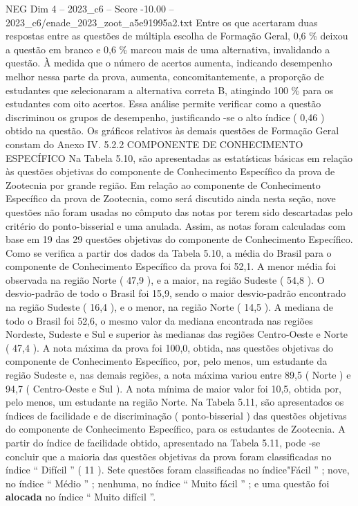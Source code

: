 \begin{textsample}{NEG Dim 4 – 2023\_c6 – Score -10.00 – 2023\_c6/enade\_2023\_zoot\_a5e91995a2.txt}
Entre os que acertaram duas respostas entre as questões de múltipla escolha de Formação Geral, 0,6 \% deixou a questão em branco e 0,6 \% marcou mais de uma alternativa, invalidando a questão.
À medida que o número de acertos aumenta, indicando desempenho melhor nessa parte da prova, aumenta, concomitantemente, a proporção de estudantes que selecionaram a alternativa correta B, atingindo 100 \% para os estudantes com oito acertos.
Essa análise permite verificar como a questão discriminou os grupos de desempenho, justificando -se o alto índice ( 0,46 ) obtido na questão.
Os gráficos relativos às demais questões de Formação Geral constam do Anexo IV. 5.2.2 COMPONENTE DE CONHECIMENTO ESPECÍFICO Na Tabela 5.10, são apresentadas as estatísticas básicas em relação às questões objetivas do componente de Conhecimento Específico da prova de Zootecnia por grande região.
Em relação ao componente de Conhecimento Específico da prova de Zootecnia, como será discutido ainda nesta seção, nove questões não foram usadas no cômputo das notas por terem sido descartadas pelo critério do ponto-bisserial e uma anulada.
Assim, as notas foram calculadas com base em 19 das 29 questões objetivas do componente de Conhecimento Específico.
Como se verifica a partir dos dados da Tabela 5.10, a média do Brasil para o componente de Conhecimento Específico da prova foi 52,1.
A menor média foi observada na região Norte ( 47,9 ), e a maior, na região Sudeste ( 54,8 ).
O desvio-padrão de todo o Brasil foi 15,9, sendo o maior desvio-padrão encontrado na região Sudeste ( 16,4 ), e o menor, na região Norte ( 14,5 ).
A mediana de todo o Brasil foi 52,6, o mesmo valor da mediana encontrada nas regiões Nordeste, Sudeste e Sul e superior às medianas das regiões Centro-Oeste e Norte ( 47,4 ).
A nota máxima da prova foi 100,0, obtida, nas questões objetivas do componente de Conhecimento Específico, por, pelo menos, um estudante da região Sudeste e, nas demais regiões, a nota máxima variou entre 89,5 ( Norte ) e 94,7 ( Centro-Oeste e Sul ).
A nota mínima de maior valor foi 10,5, obtida por, pelo menos, um estudante na região Norte.
Na Tabela 5.11, são apresentados os índices de facilidade e de discriminação ( ponto-bisserial ) das questões objetivas do componente de Conhecimento Específico, para os estudantes de Zootecnia.
A partir do índice de facilidade obtido, apresentado na Tabela 5.11, pode -se concluir que a maioria das questões objetivas da prova foram classificadas no índice “ Difícil ” ( 11 ).
Sete questões foram classificadas no índice"Fácil ” ; nove, no índice “ Médio ” ; nenhuma, no índice “ Muito fácil ” ; e uma questão foi \textbf{alocada} no índice “ Muito difícil ”.

\end{textsample}
